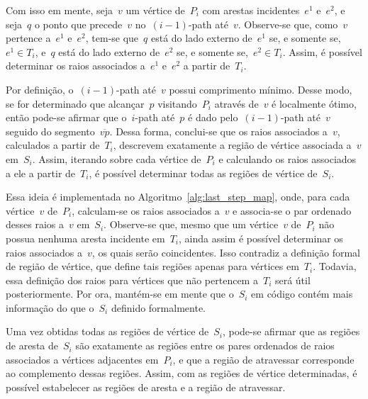 \documentclass[11pt]{article}
\newcommand{\algref}[1]{\ref{#1}}
\begin{document}
Com isso em mente, seja~\(v\) um vértice de~\(P_i\) com arestas incidentes~\(e^1\) e~\(e^2\), e seja~\(q\) o ponto que precede~\(v\) no~\((i - 1)\)-path até~\(v\). Observe-se que, como~\(v\) pertence a~\(e^1\) e~\(e^2\), tem-se que~\(q\) está do lado externo de~\(e^1\) se, e somente se,~\(e^1 \in T_i\), e~\(q\) está do lado externo de~\(e^2\) se, e somente se,~\(e^2 \in T_i\). Assim, é possível determinar os raios associados a~\(e^1\) e~\(e^2\) a partir de~\(T_i\).

Por definição, o~\((i - 1)\)-path até~\(v\) possui comprimento mínimo. Desse modo, se for determinado que alcançar~\(p\) visitando~\(P_i\) através de~\(v\) é localmente ótimo, então pode-se afirmar que o~\(i\)-path até~\(p\) é dado pelo~\((i - 1)\)-path até~\(v\) seguido do segmento~\(\overline{vp}\). Dessa forma, conclui-se que os raios associados a~\(v\), calculados a partir de~\(T_i\), descrevem exatamente a região de vértice associada a~\(v\) em~\(S_i\). Assim, iterando sobre cada vértice de~\(P_i\) e calculando os raios associados a ele a partir de~\(T_i\), é possível determinar todas as regiões de vértice de~\(S_i\). 

Essa ideia é implementada no Algoritmo~\algref{alg:last_step_map}, onde, para cada vértice~\(v\) de~\(P_i\), calculam-se os raios associados a~\(v\) e associa-se o par ordenado desses raios a~\(v\) em~\(S_i\). Observe-se que, mesmo que um vértice~\(v\) de~\(P_i\) não possua nenhuma aresta incidente em~\(T_i\), ainda assim é possível determinar os raios associados a~\(v\), os quais serão coincidentes. Isso contradiz a definição formal de região de vértice, que define tais regiões apenas para vértices em~\(T_i\). Todavia, essa definição dos raios para vértices que não pertencem a~\(T_i\) será útil posteriormente. Por ora, mantém-se em mente que o~\(S_i\) em código contém mais informação do que o~\(S_i\) definido formalmente.

Uma vez obtidas todas as regiões de vértice de~\(S_i\), pode-se afirmar que as regiões de aresta de~\(S_i\) são exatamente as regiões entre os pares ordenados de raios associados a vértices adjacentes em~\(P_i\), e que a região de atravessar corresponde ao complemento dessas regiões. Assim, com as regiões de vértice determinadas, é possível estabelecer as regiões de aresta e a região de atravessar.
\end{document}
